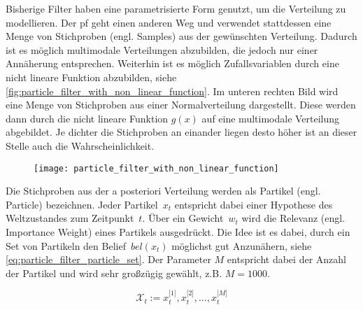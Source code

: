 Bisherige Filter haben eine parametrisierte Form genutzt, um die Verteilung zu modellieren. Der \Gls{pf} geht einen anderen Weg und verwendet stattdessen eine Menge von Stichproben (engl. Samples) aus der gewünschten Verteilung. Dadurch ist es möglich multimodale Verteilungen abzubilden, die jedoch nur einer Annäherung entsprechen. Weiterhin ist es möglich Zufallsvariablen durch eine nicht lineare Funktion abzubilden, siehe \autoref {fig:particle_filter_with_non_linear_function}. Im unteren rechten Bild wird eine Menge von Stichproben aus einer Normalverteilung dargestellt. Diese werden dann durch die nicht lineare Funktion $g(x)$ auf eine multimodale Verteilung abgebildet. Je dichter die Stichproben an einander liegen desto höher ist an dieser Stelle auch die Wahrscheinlichkeit.

\begin{figure}
	\centering
	\texttt{[image: particle\_filter\_with\_non\_linear\_function]}
	\label{fig:particle_filter_with_non_linear_function}
\end{figure}

Die Stichproben aus der a posteriori Verteilung werden als Partikel (engl. Particle) bezeichnen. Jeder Partikel~$x_t$ entspricht dabei einer Hypothese des Weltzustandes zum Zeitpunkt~$t$. Über ein Gewicht~$w_t$ wird die Relevanz (engl. Importance Weight) eines Partikels ausgedrückt. Die Idee ist es dabei, durch ein Set von Partikeln den Belief~$bel(x_t)$ möglichst gut Anzunähern, siehe \autoref{eq:particle_filter_particle_set}. Der Parameter $M$ entspricht dabei der Anzahl der Partikel und wird sehr großzügig gewählt, z.B. $M=1000$.

\begin{equation}
\mathcal{X}_t := x^{\lbrack 1 \rbrack}_t, x^{\lbrack 2 \rbrack}_t, \ldots, x^{\lbrack M \rbrack}_t \label{eq:particle_filter_particle_set}
\end{equation}

